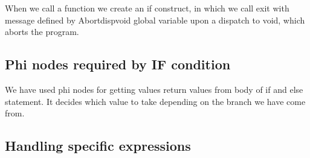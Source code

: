 \documentclass{article}
\begin{document}
When we call a function we create an if construct, in which we call exit with message defined by Abortdispvoid global variable upon a dispatch to void, which aborts the program.

\subsection{Phi nodes required by IF condition}

We have used phi nodes for getting values return values from body of if and else statement. It decides which value to take depending on the branch we have come from.

\subsection{Handling specific expressions}
\end{document}
